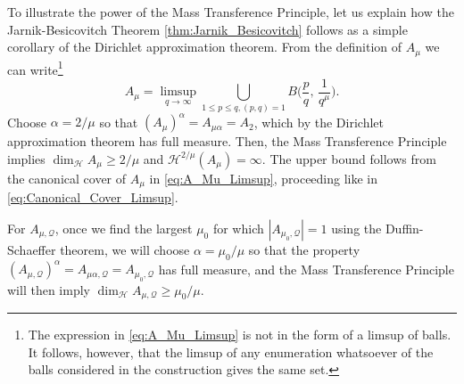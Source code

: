 \documentclass[11pt,reqno]{amsart}
\theoremstyle{definition}
\begin{document}
To illustrate the power of the Mass Transference Principle, 
let us explain how the Jarnik-Besicovitch Theorem \ref{thm:Jarnik_Besicovitch} follows as a simple corollary of the Dirichlet approximation theorem. 
From the definition of $A_\mu$ we can write\footnote{The expression in \eqref{eq:A_Mu_Limsup} is not in the form of a limsup of balls.
It follows, however, that the limsup of any enumeration whatsoever of the balls considered in the construction gives the same set.}
\begin{equation}\label{eq:A_Mu_Limsup}
A_\mu = \limsup_{q \to \infty} \bigcup_{1 \leq p \leq q, (p,q) = 1} B\Big( \frac{p}{q}, \, \frac{1}{q^\mu} \Big). 
\end{equation}
Choose $\alpha = 2/\mu$ so that $(A_\mu)^\alpha = A_{\mu\alpha} =  A_2$, which by the Dirichlet approximation theorem has full measure. 
Then, the Mass Transference Principle implies
$\operatorname{dim}_{\mathcal H} A_\mu \geq 2/\mu$ and $\mathcal H^{2/\mu} (A_\mu) = \infty$. 
The upper bound follows from the canonical cover of $A_\mu$ in \eqref{eq:A_Mu_Limsup}, 
proceeding like in \eqref{eq:Canonical_Cover_Limsup}.
 
 For $A_{\mu,\mathcal Q}$,  
 once we find the largest $\mu_0$ for which $|A_{\mu_0,\mathcal Q}|=1$ using the Duffin-Schaeffer theorem,
we will choose $\alpha = \mu_0 / \mu$ so that the property $(A_{\mu,\mathcal Q})^\alpha = A_{\mu \alpha, \mathcal Q } = A_{\mu_0, \mathcal Q}$ has full measure, 
and the Mass Transference Principle will then imply $\operatorname{dim}_{\mathcal H} A_{\mu, \mathcal Q} \geq \mu_0/\mu$. 


\end{document}
